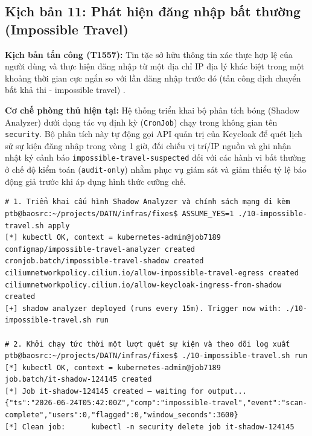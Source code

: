 
\subsection{Kịch bản 11: Phát hiện đăng nhập bất thường (Impossible Travel)}
\label{subsec:c3_kb11}

\textbf{Kịch bản tấn công (T1557):} Tin tặc sở hữu thông tin xác thực hợp lệ của người dùng và thực hiện đăng nhập từ một địa chỉ IP địa lý khác biệt trong một khoảng thời gian cực ngắn so với lần đăng nhập trước đó (tấn công dịch chuyển bất khả thi - impossible travel) \parencite{mitre_t1557}.

\textbf{Cơ chế phòng thủ hiện tại:} Hệ thống triển khai bộ phân tích bóng (Shadow Analyzer) dưới dạng tác vụ định kỳ (\texttt{CronJob}) chạy trong không gian tên \texttt{security}. Bộ phân tích này tự động gọi API quản trị của Keycloak để quét lịch sử sự kiện đăng nhập trong vòng 1 giờ, đối chiếu vị trí/IP nguồn và ghi nhận nhật ký cảnh báo \texttt{impossible-travel-suspected} đối với các hành vi bất thường ở chế độ kiểm toán (\texttt{audit-only}) nhằm phục vụ giám sát và giảm thiểu tỷ lệ báo động giả trước khi áp dụng hình thức cưỡng chế.

\begin{listing}[H]
\begin{verbatim}
# 1. Triển khai cấu hình Shadow Analyzer và chính sách mạng đi kèm
ptb@baosrc:~/projects/DATN/infras/fixes$ ASSUME_YES=1 ./10-impossible-travel.sh apply
[*] kubectl OK, context = kubernetes-admin@job7189
configmap/impossible-travel-analyzer created
cronjob.batch/impossible-travel-shadow created
ciliumnetworkpolicy.cilium.io/allow-impossible-travel-egress created
ciliumnetworkpolicy.cilium.io/allow-keycloak-ingress-from-shadow created
[+] shadow analyzer deployed (runs every 15m). Trigger now with: ./10-impossible-travel.sh run

# 2. Khởi chạy tức thời một lượt quét sự kiện và theo dõi log xuất
ptb@baosrc:~/projects/DATN/infras/fixes$ ./10-impossible-travel.sh run
[*] kubectl OK, context = kubernetes-admin@job7189
job.batch/it-shadow-124145 created
[*] Job it-shadow-124145 created — waiting for output...
{"ts":"2026-06-24T05:42:00Z","comp":"impossible-travel","event":"scan-complete","users":0,"flagged":0,"window_seconds":3600}
[*] Clean job:      kubectl -n security delete job it-shadow-124145
\end{verbatim}
\caption{Quá trình triển khai thực tế và nhật ký hoàn thành việc quét của Shadow Analyzer}
\label{lst:c3_kb11}
\end{listing}

